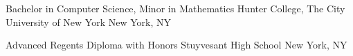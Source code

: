 

\begin{cventries}


  \cventryeduitems
    {Bachelor in Computer Science, Minor in Mathematics} %
    {Hunter College, The City University of New York} %
    {New York, NY} %

  \cventryeduitems
    {Advanced Regents Diploma with Honors} %
    {Stuyvesant High School} %
    {New York, NY} %

\end{cventries}
